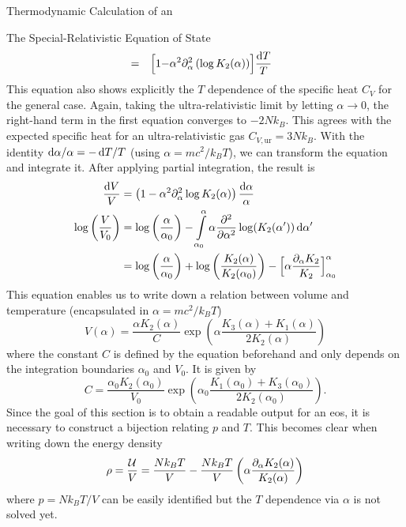 \begin{section}{Thermodynamic Calculation of an }
\begin{subsection}{The Special-Relativistic Equation of State}
\begin{alignat}{3}
    &= &\Bigl[1 - &\alpha^2\partial_\alpha^2\left(\log K_2(\alpha)\right)\Bigr]\frac{\mathop{}\!\mathrm{d} T}{T}
\end{alignat}
This equation also shows explicitly the $T$ dependence of the specific heat $C_V$ for the general case.
Again, taking the ultra-relativistic limit by letting $\alpha\rightarrow0$, the right-hand term in the first equation converges to $-2Nk_B$.
This agrees with the expected specific heat for an ultra-relativistic gas $C_{V,\text{ur}}=3Nk_B$.
With the identity $\mathop{}\!\mathrm{d}\alpha/\alpha = -\mathop{}\!\mathrm{d} T/T$ (using $\alpha=mc^2/k_BT$), we can transform the equation and integrate it.
After applying partial integration, the result is
\begin{align}
	\frac{\mathop{}\!\mathrm{d} V}{V} &= \left(1-\alpha^2\partial_\alpha^2\log K_2(\alpha)\right)\frac{\mathop{}\!\mathrm{d}\alpha}{\alpha}\\
    \log\left(\frac{V}{V_0}\right) &= \log\left(\frac{\alpha}{\alpha_0}\right) - \int\limits_{\alpha_0}^\alpha \alpha\frac{\partial^2}{\partial \alpha^2}\log(K_2(\alpha'))\mathop{}\!\mathrm{d}\alpha'\\
    &=\log\left(\frac{\alpha}{\alpha_0}\right) + \log\left(\frac{K_2(\alpha)}{K_2(\alpha_0)}\right) - \Bigl[\alpha\frac{\partial_\alpha K_2}{K_2}\Bigr]_{\alpha_0}^\alpha
\end{align}
This equation enables us to write down a relation between volume and temperature (encapsulated in $\alpha=mc^2/k_BT$)
\begin{equation}
	V(\alpha) = \frac{\alpha K_2(\alpha)}{C}\exp\left(\alpha\frac{K_3(\alpha)+K_1(\alpha)}{2K_2(\alpha)}\right)
\end{equation}
where the constant $C$ is defined by the equation beforehand and only depends on the integration boundaries $\alpha_0$ and $V_0$. It is given by
\begin{equation}
	C = \frac{\alpha_0 K_2(\alpha_0)}{V_0}\exp\left(\alpha_0\frac{K_1(\alpha_0)+K_3(\alpha_0)}{2K_2(\alpha_0)}\right).
\end{equation}
Since the goal of this section is to obtain a readable output for an \ac{eos}, it is necessary to construct a bijection relating $p$ and $T$.
This becomes clear when writing down the energy density %
\begin{equation}
	\rho = \frac{\mathcal{U}}{V} = \frac{Nk_BT}{V} - \frac{Nk_BT}{V}\left(\alpha\frac{\partial_\alpha K_2(\alpha)}{K_2(\alpha)}\right)
	\label{2-IntEner-DensityAlpha}
\end{equation}
where $p=Nk_BT/V$ can be easily identified but the $T$ dependence via $\alpha$ is not solved yet.\\

\end{subsection}
\end{section}
